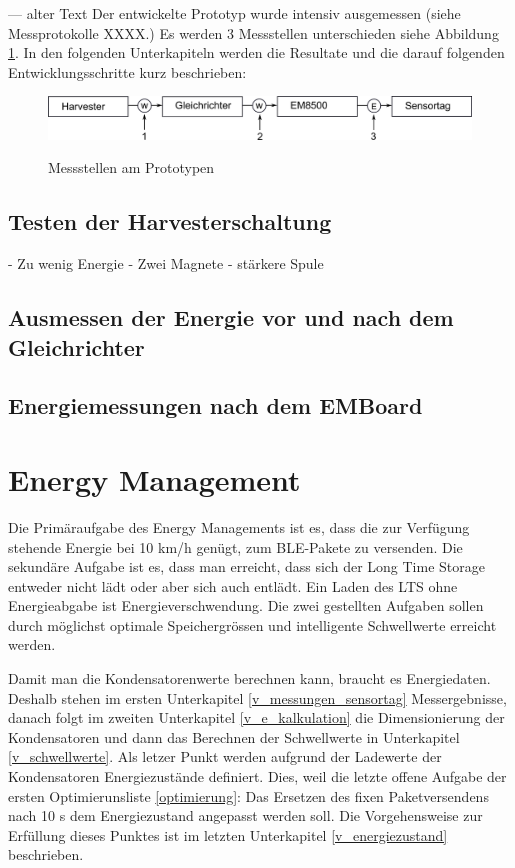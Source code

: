 --- alter Text
Der entwickelte Prototyp wurde intensiv ausgemessen (siehe Messprotokolle XXXX.)  Es werden 3 Messstellen unterschieden siehe Abbildung \ref{EnergieMessungStellen}. In den folgenden Unterkapiteln werden die Resultate und die darauf folgenden Entwicklungsschritte kurz beschrieben:

\begin{figure}
  \includegraphics[width=1.0\textwidth]{3Vorgehen/imag/EnergiemessungStellen.png}\label{EnergieMessungStellen} 
  \caption{Messstellen am Prototypen}
\end{figure}

\subsection{Testen der Harvesterschaltung}

- Zu wenig Energie
- Zwei Magnete
- stärkere Spule

\subsection{Ausmessen der Energie vor und nach dem Gleichrichter}


\subsection{Energiemessungen nach dem EMBoard}



\section{Energy Management}

Die Primäraufgabe des Energy Managements ist es, dass die zur Verfügung stehende Energie bei 10 km/h genügt, zum BLE-Pakete zu versenden. Die sekundäre Aufgabe ist es, dass man erreicht, dass sich der Long Time Storage entweder nicht lädt oder aber sich auch entlädt. Ein Laden des LTS ohne Energieabgabe ist Energieverschwendung. Die zwei gestellten Aufgaben sollen durch möglichst optimale Speichergrössen und intelligente Schwellwerte erreicht werden.

Damit man die Kondensatorenwerte berechnen kann, braucht es Energiedaten. Deshalb stehen im ersten Unterkapitel \ref{v_messungen_sensortag} Messergebnisse, danach folgt im zweiten Unterkapitel \ref{v_e_kalkulation} die Dimensionierung der Kondensatoren und dann das Berechnen der Schwellwerte in Unterkapitel \ref{v_schwellwerte}. Als letzer Punkt werden aufgrund der Ladewerte der Kondensatoren Energiezustände definiert. Dies, weil die letzte offene Aufgabe der ersten Optimierunsliste \ref{optimierung}: Das Ersetzen des fixen Paketversendens nach 10 s dem Energiezustand angepasst werden soll. Die Vorgehensweise zur Erfüllung dieses Punktes ist im letzten Unterkapitel \ref{v_energiezustand} beschrieben. 



